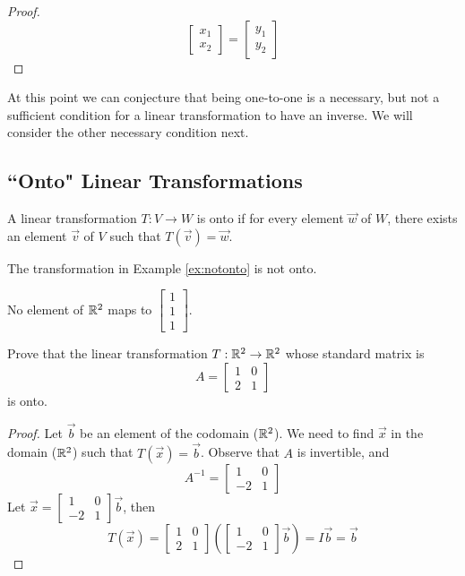 \documentclass{ximera}
\begin{document}
\begin{example}
\begin{proof}
$$\begin{bmatrix}x_1\\x_2\end{bmatrix}=\begin{bmatrix}y_1\\y_2\end{bmatrix}$$
\end{proof}
\end{example}

At this point we can conjecture that being one-to-one is a necessary, but not a sufficient condition for a linear transformation to have an inverse.  We will consider the other necessary condition next.

\subsection*{``Onto" Linear Transformations}

\begin{definition}[Onto]\label{def:onto} A linear transformation $T:V\rightarrow W$ is onto if for every element $\vec{w}$ of $W$, there exists an element $\vec{v}$ of $V$ such that $T(\vec{v})=\vec{w}$.
\end{definition}

\begin{example}
The transformation in Example \ref{ex:notonto} is not onto.
\begin{explanation}
No element of $\mathbb{R}^2$ maps to $\begin{bmatrix}1\\1\\1\end{bmatrix}$.
\end{explanation}
\end{example}

\begin{example} Prove that the linear transformation $T:\mathbb{R}^2\rightarrow \mathbb{R}^2$ whose standard matrix is $$A=\begin{bmatrix}1&0\\2&1\end{bmatrix}$$ is onto.
\begin{proof} Let $\vec{b}$ be an element of the codomain ($\mathbb{R}^2$).  We need to find $\vec{x}$ in the domain ($\mathbb{R}^2$) such that $T(\vec{x})=\vec{b}$. 
Observe that $A$ is invertible, and $$A^{-1}=\begin{bmatrix}1&0\\-2&1\end{bmatrix}$$
 Let $\vec{x}=\begin{bmatrix}1&0\\-2&1\end{bmatrix}\vec{b}$, then 
 $$T(\vec{x})=\begin{bmatrix}1&0\\2&1\end{bmatrix}\left(\begin{bmatrix}1&0\\-2&1\end{bmatrix}\vec{b}\right)=I\vec{b}=\vec{b}$$
\end{proof}
\end{example}
\end{document}
